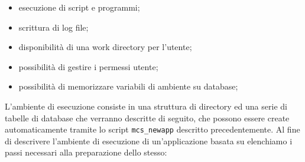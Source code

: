\begin{itemize}
\item esecuzione di script e programmi;
\item scrittura di log file;
\item disponibilit\`a di una work directory per l'utente;
\item possibilit\`a di gestire i permessi utente;
\item possibilit\`a di memorizzare variabili di ambiente su database;
\end{itemize}
%
L'ambiente di esecuzione consiste in una struttura di directory ed una
serie di tabelle di database che verranno descritte di seguito, che
possono essere create automaticamente tramite lo script
\verb|mcs_newapp| descritto precedentemente. Al fine di descrivere
l'ambiente di esecuzione di un'applicazione basata su \mcs
elenchiamo i passi necessari alla preparazione dello stesso:

